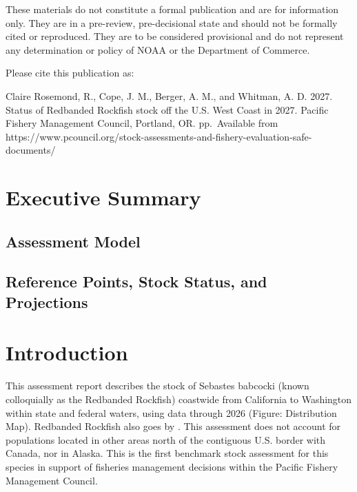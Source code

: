 \documentclass[
  letterpaper,
]{article}
\begin{document}
These materials do not constitute a formal publication and are for
information only. They are in a pre-review, pre-decisional state and
should not be formally cited or reproduced. They are to be considered
provisional and do not represent any determination or policy of NOAA or
the Department of Commerce.

\newpage{}

Please cite this publication as:

Claire Rosemond, R., Cope, J. M., Berger, A. M., and Whitman, A. D.
2027. Status of Redbanded Rockfish stock off the U.S. West Coast in
2027. Pacific Fishery Management Council, Portland, OR.
\pageref*{LastPage}{} pp.~Available from
https://www.pcouncil.org/stock-assessments-and-fishery-evaluation-safe-documents/

\newpage{}

\section{Executive Summary}\label{sec-exec-sum}

\subsection{Assessment Model}\label{sec-assessment-model}

\subsection{Reference Points, Stock Status, and
Projections}\label{sec-reference-points-stock-status-and-projections}

\newpage{}

\section{Introduction}\label{sec-intro}

This assessment report describes the stock of Sebastes babcocki (known
colloquially as the Redbanded Rockfish) coastwide from California to
Washington within state and federal waters, using data through 2026
(Figure: Distribution Map). Redbanded Rockfish also goes by . This
assessment does not account for populations located in other areas north
of the contiguous U.S. border with Canada, nor in Alaska. This is the
first benchmark stock assessment for this species in support of
fisheries management decisions within the Pacific Fishery Management
Council.
\end{document}
